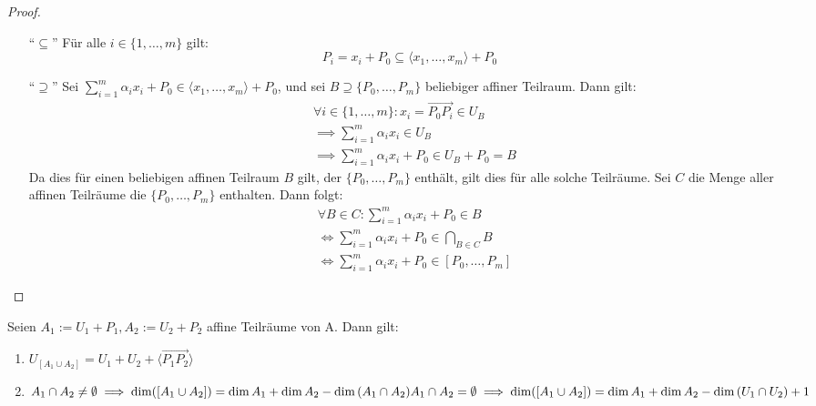 \documentclass[parskip,a4paper,twoside,DIV15,BCOR12mm]{scrbook}
\begin{document}
\begin{proof}
\begin{enumerate}
\item["`$\subseteq$"'] Für alle $i\in\{1,\ldots,m\}$ gilt:
\[P_i=x_i+P_0\subseteq\langle x_1,\ldots,x_m\rangle+P_0\]
\item["`$\supseteq$"'] Sei $\sum_{i=1}^m{\alpha_i x_i+P_0}\in\langle x_1,\ldots,x_m\rangle+P_0$,
und sei $B\supseteq\{P_0,\ldots,P_m\}$ beliebiger affiner Teilraum. Dann gilt:
\begin{align*}
&\forall i\in\{1,\ldots,m\}: x_i=\overrightarrow{P_0P_i}\in U_B\\
&\implies \sum_{i=1}^m{\alpha_i x_i}\in U_B\\
&\implies \sum_{i=1}^m{\alpha_i x_i+P_0}\in U_B+P_0=B
\end{align*}
Da dies für einen beliebigen affinen Teilraum $B$ gilt, der $\{P_0,\ldots,P_m\}$ enthält, gilt dies für alle
solche Teilräume. Sei $C$ die Menge aller affinen Teilräume die $\{P_0,\ldots,P_m\}$ enthalten. Dann folgt:
\begin{align*}
&\forall B\in C: \sum_{i=1}^m{\alpha_i x_i+P_0}\in B\\ 
&\iff \sum_{i=1}^m{\alpha_i x_i+P_0}\in\bigcap_{B\in C}B\\
&\iff \sum_{i=1}^m{\alpha_i x_i+P_0}\in[P_0,\ldots,P_m]
\end{align*}
\end{enumerate}
\end{proof}

\begin{theo}
\label{Satz 20.2}
Seien $A_1:=U_1+P_1,A_2:=U_2+P_2$ affine Teilräume von A. Dann gilt:
\begin{enumerate}
\item $U_{[A_1\cup A_2]}=U_1+U_2+\langle\overrightarrow{P_1P_2}\rangle$
\item $A_1\cap A_2\ne\emptyset \implies \dim([A_1\cup A_2])=\dim{A_1}+\dim{A_2}-\dim{(A_1\cap A_2)}\\
A_1\cap A_2=\emptyset \implies \dim([A_1\cup A_2])=\dim{A_1}+\dim{A_2}-\dim{(U_1\cap U_2)}+1$
\end{enumerate}
\end{theo}
\end{document}
